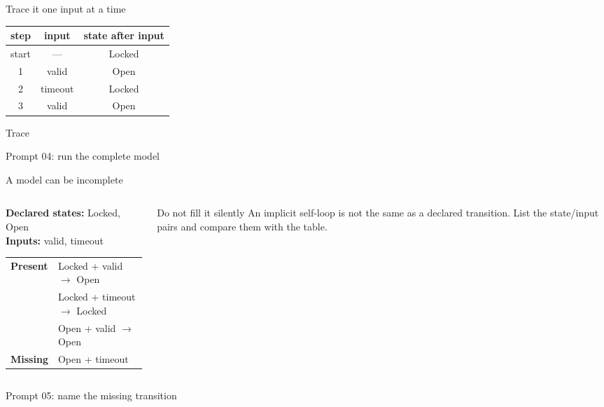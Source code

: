 \begin{frame}{Trace it one input at a time}
\begin{center}
\begin{tabular}{c|c|c}
\textbf{step} & \textbf{input} & \textbf{state after input}\\\midrule
start & --- & Locked\\
1 & valid & Open\\
2 & timeout & Locked\\
3 & valid & Open
\end{tabular}
\end{center}
\begin{block}{Trace}
\end{block}
\end{frame}

\begin{frame}[fragile]{Prompt 04: run the complete model}
\end{frame}

\begin{frame}{A model can be incomplete}
\begin{columns}[T]
\begin{column}{0.48\textwidth}
\textbf{Declared states:} Locked, Open\\
\textbf{Inputs:} valid, timeout\\[6pt]
\begin{tabular}{@{}l l@{}}
\textbf{Present} & Locked + valid $\to$ Open\\
& Locked + timeout $\to$ Locked\\
& Open + valid $\to$ Open\\
\textbf{Missing} & Open + timeout
\end{tabular}
\end{column}
\begin{column}{0.47\textwidth}
\begin{alertblock}{Do not fill it silently}
An implicit self-loop is not the same as a declared transition. List the state/input pairs and compare them with the table.
\end{alertblock}
\end{column}
\end{columns}
\end{frame}

\begin{frame}[fragile]{Prompt 05: name the missing transition}
\end{frame}

